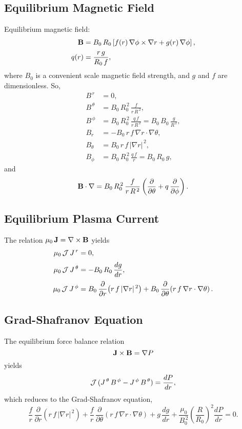 \documentclass[12pt]{article}
\begin{document}
\subsection{Equilibrium Magnetic Field}
Equilibrium magnetic field:
\begin{align}
{\bf B}& =B_0\,R_0\left[ f(r)\,\nabla\phi\times \nabla r + g(r)\,\nabla\phi\right],\\[0.5ex]
q(r)&= \frac{r\,g}{R_0\,f},
\end{align}
where $B_0$ is a convenient scale magnetic field strength, and $g$ and $f$ are dimensionless.
So,
\begin{align}
B^{\,r} &=0,\\[0.5ex]
B^{\,\theta}&=B_0\,R_0^{\,2}\, \frac{f}{r\,R^{\,2}},\\[0.5ex]
B^{\,\phi} &= B_0\,R_0^{\,2}\,\frac{q\,f}{r\,R^{\,2}}= B_0\,B_0\,\frac{g}{R^{\,2}},\\[0.5ex]
B_r&= - B_0\,r\,f\,\nabla r\cdot\nabla\theta,\\[0.5ex]
B_\theta &= B_0\,r\,f\,|\nabla r|^{\,2},\\[0.5ex]
B_\phi &= B_0\,R_0^{\,2}\,\frac{q\,f}{r} = B_0\,R_0\,g,
\end{align}
and
\begin{equation}
{\bf B}\cdot\nabla = B_0\,R_0^{\,2}\,
\frac{f}{r\,R^{\,2}}\left(\frac{\partial}{\partial \theta}+q\,\frac{\partial}{\partial\phi}\right).
\end{equation}

\subsection{Equilibrium Plasma Current}
The relation $\mu_0\,{\bf J} = \nabla\times{\bf B}$ yields 
\begin{align}
\mu_0\,{\cal J}\,J^{\,r}&= 0,\\[0.5ex]
\mu_0\,{\cal J}\,J^{\,\theta} &= - B_0\,R_0\,\frac{dg}{dr},\\[0.5ex]
\mu_0\,{\cal J}\,J^{\,\phi} &= B_0\,\frac{\partial}{\partial r}\!\left(r\,f\,|\nabla r|^{\,2}\right) +B_0\,\frac{\partial}{\partial\theta}\!\left(r\,f\,\nabla r\cdot\nabla\theta\right).
\end{align} 

\subsection{Grad-Shafranov Equation}
The equilibrium force balance relation
\begin{equation}
{\bf J}\times{\bf B} = \nabla P
\end{equation}
yields
\begin{equation}
{\cal J}\,(J^{\,\theta}\,B^{\,\phi}- J^{\,\phi}\,B^{\,\theta})= \frac{dP}{dr},
\end{equation}
which reduces to the Grad-Shafranov equation, 
\begin{equation} 
\frac{f}{r}\,\frac{\partial}{\partial r}\!\left(r\,f\,|\nabla r|^{\,2}\right) + \frac{f}{r}\,\frac{\partial}{\partial \theta}\!\left(r\,f\,\nabla r\cdot\nabla\theta\right) + g\,\frac{dg}{dr} + \frac{\mu_0}{B_0^{\,2}}\left(\frac{R}{R_0}\right)^2\frac{dP}{dr} = 0.
\end{equation}
\end{document}
